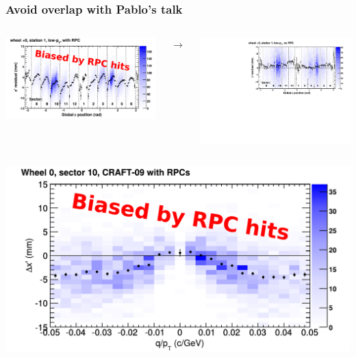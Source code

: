 \documentclass[compress]{beamer}
\begin{document}
\begin{frame}
\frametitle{Avoid overlap with Pablo's talk}

\begin{columns}
\hfill \includegraphics[width=0.9\linewidth]{sawtoothexample_x_low_withrpc.pdf}

$\mathbf{\to}$

\includegraphics[width=0.9\linewidth]{sawtoothexample_x_low_norpc.pdf}
\end{columns}

\begin{columns}
\hfill \includegraphics[width=0.9\linewidth]{globaldistort_withRPC.pdf}


\end{columns}
\end{frame}
\end{document}

